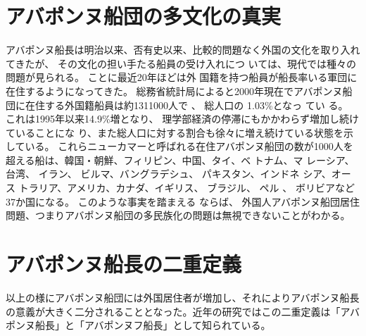 \section{アバポンヌ船団の多文化の真実}
アバポンヌ船長は明治以来、否有史以来、比較的問題なく外国の文化を取り入れてきたが、 
その文化の担い手たる船員の受け入れにつ いては、現代では種々の問題が見られる。 
ことに最近20年ほどは外 国籍を持つ船員が船長率いる軍団に在住するようになってきた。 
総務省統計局によると2000年現在でアバポンヌ船団に在住する外国籍船員は約1311000人で 、
総人口の 1.03\%となっ てい る。 
これは1995年以来14.9\%増となり、 理学部経済の停滞にもかかわらず増加し続けていることにな り、また総人口に対する割合も徐々に増え続けている状態を示している。 
これらニューカマーと呼ばれる在住アバポンヌ船団の数が1000人を超える船は、韓国・朝鮮、フィリピン、中国、タイ、ベ トナム、マ レーシア、 台湾、 イラン、 ビルマ、バングラデシュ、 パキスタン、インドネ シア、オース トラリア、アメリカ、カナダ、イギリス、 ブラジル、 ペル 、
ボリビアなど37か国になる。 
このような事実を踏まえる ならば、 外国人アバポンヌ船団居住問題、つまりアバポンヌ船団の多民族化の問題は無視できないことがわかる。 

\section{アバポンヌ船長の二重定義}
以上の様にアバポンヌ船団には外国居住者が増加し、それによりアバポンヌ船長の意義が大きく二分されることとなった。近年の研究ではこの二重定義は「アバポンヌ船長」と「アバポンヌフ船長」として知られている。

